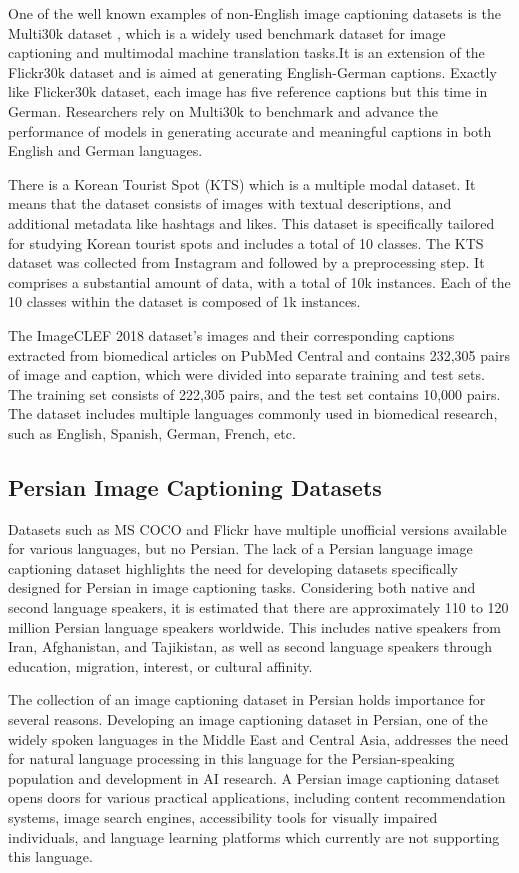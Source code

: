 \documentclass[runningheads]{llncs}
\begin{document}
One of the well known examples of non-English image captioning datasets is the Multi30k dataset \cite{Multi30k}, which is a widely used benchmark dataset for image captioning and multimodal machine translation tasks.It is an extension of the Flickr30k dataset \cite{Flickr30k} and is aimed at generating English-German captions. Exactly like Flicker30k dataset, each image has five reference captions but this time in German. Researchers rely on Multi30k to benchmark and advance the performance of models in generating accurate and meaningful captions in both English and German languages.

There is a Korean Tourist Spot (KTS) \cite{Korean} which is a multiple modal dataset. It means that the dataset consists of images with textual descriptions, and additional metadata like hashtags and likes. This dataset is specifically tailored for studying Korean tourist spots and includes a total of 10 classes. The KTS dataset was collected from Instagram and followed by a preprocessing step. It comprises a substantial amount of data, with a total of 10k instances. Each of the 10 classes within the dataset is composed of 1k instances.

The ImageCLEF 2018 \cite{ImageCLEF2018} dataset's images and their corresponding captions extracted from biomedical articles on PubMed Central and contains 232,305 pairs of image and caption, which were divided into separate training and test sets. The training set consists of 222,305 pairs, and the test set contains 10,000 pairs. The dataset includes multiple languages commonly used in biomedical research, such as English, Spanish, German, French, etc.

\subsection{Persian Image Captioning Datasets}
Datasets such as MS COCO and Flickr have multiple unofficial versions available for various languages, but no Persian. The lack of a Persian language image captioning dataset highlights the need for developing datasets specifically designed for Persian in image captioning tasks. Considering both native and second language speakers, it is estimated that there are approximately 110 to 120 million Persian language speakers worldwide. This includes native speakers from Iran, Afghanistan, and Tajikistan, as well as second language speakers through education, migration, interest, or cultural affinity.

The collection of an image captioning dataset in Persian holds importance for several reasons. Developing an image captioning dataset in Persian, one of the widely spoken languages in the Middle East and Central Asia, addresses the need for natural language processing in this language for the Persian-speaking population and development in AI research. A Persian image captioning dataset opens doors for various practical applications, including content recommendation systems, image search engines, accessibility tools for visually impaired individuals, and language learning platforms which currently are not supporting this language.
\end{document}
